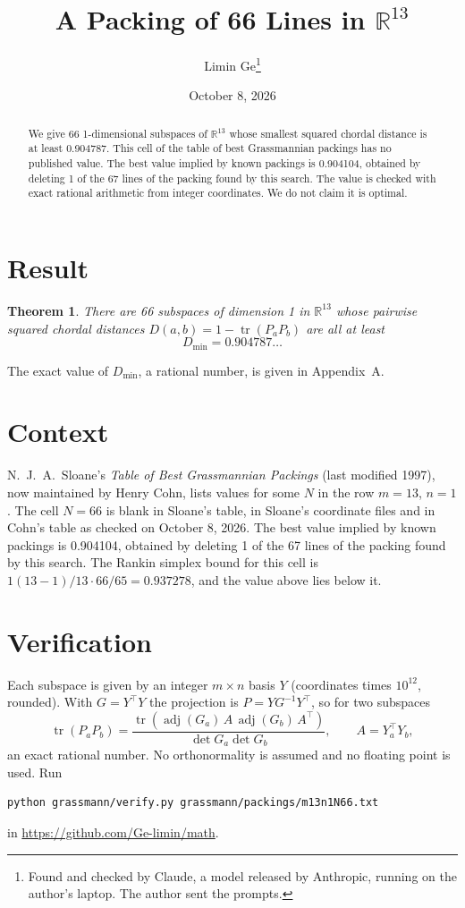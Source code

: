 \documentclass[11pt,a4paper]{article}
\title{A Packing of 66 Lines in $\mathbb{R}^{13}$}
\author{Limin Ge\thanks{Found and checked by Claude, a model released by Anthropic, running on the author's laptop. The author sent the prompts.}}
\date{October 8, 2026}
\newtheorem*{theorem}{Theorem}
\begin{document}
\maketitle
\begin{abstract}
We give 66 1-dimensional subspaces of $\mathbb{R}^{13}$ whose smallest squared chordal distance is at least 0.904787. This cell of the table of best Grassmannian packings has no published value. The best value implied by known packings is 0.904104, obtained by deleting 1 of the 67 lines of the packing found by this search. The value is checked with exact rational arithmetic from integer coordinates. We do not claim it is optimal.
\end{abstract}

\section{Result}
\begin{theorem}
There are 66 subspaces of dimension 1 in $\mathbb{R}^{13}$ whose pairwise squared chordal distances $D(a,b) = 1 - \operatorname{tr}(P_aP_b)$ are all at least
\[ D_{\min} = 0.904787\ldots \]
\end{theorem}
The exact value of $D_{\min}$, a rational number, is given in Appendix~A.


\section{Context}
N.~J.~A.~Sloane's \emph{Table of Best Grassmannian Packings} (last modified 1997), now maintained by Henry Cohn, lists values for some $N$ in the row $m=13$, $n=1$. The cell $N=66$ is blank in Sloane's table, in Sloane's coordinate files and in Cohn's table as checked on October 8, 2026. The best value implied by known packings is 0.904104, obtained by deleting 1 of the 67 lines of the packing found by this search. The Rankin simplex bound for this cell is $1(13-1)/13\cdot 66/65 = 0.937278$, and the value above lies below it.


\section{Verification}
Each subspace is given by an integer $m\times n$ basis $Y$ (coordinates times $10^{12}$, rounded). With $G=Y^\top Y$ the projection is $P=YG^{-1}Y^\top$, so for two subspaces
\[ \operatorname{tr}(P_aP_b)=\frac{\operatorname{tr}(\operatorname{adj}(G_a)\,A\,\operatorname{adj}(G_b)\,A^\top)}{\det G_a\det G_b},\qquad A=Y_a^\top Y_b, \]
an exact rational number. No orthonormality is assumed and no floating point is used. Run
\begin{verbatim}
python grassmann/verify.py grassmann/packings/m13n1N66.txt
\end{verbatim}
in \url{https://github.com/Ge-limin/math}.
\end{document}
